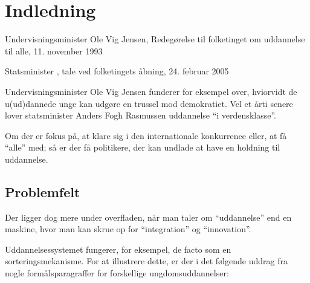 \section{Indledning}
\label{sec:intro}
\begin{epigraphs}
{Undervisningsminister Ole Vig Jensen, Redegørelse til folketinget om uddannelse til alle, 11. november 1993}

{Statsminister , tale ved folketingets åbning, 24. februar 2005}
\end{epigraphs}



Undervisningsminister Ole Vig Jensen funderer for eksempel over, hviorvidt de u(ud)dannede unge kan udgøre en trussel mod demokratiet.
 Vel et årti senere lover statsminister Anders Fogh Rasmussen uddannelse “i verdensklasse”.

 Om der er fokus på, at klare sig i den internationale konkurrence eller, at få “alle” med; så er der få politikere, der kan undlade at have en holdning til uddannelse.

\subsection{Problemfelt}
\label{sec:problem}
Der ligger dog mere under overfladen, når man taler om “uddannelse” end en maskine, hvor man kan skrue op for “integration” og “innovation”.

Uddannelsessystemet fungerer, for eksempel, de facto som en sorteringsmekanisme.
For at illustrere dette, er der i det følgende uddrag fra nogle formålsparagraffer for forskellige ungdomsuddannelser:

